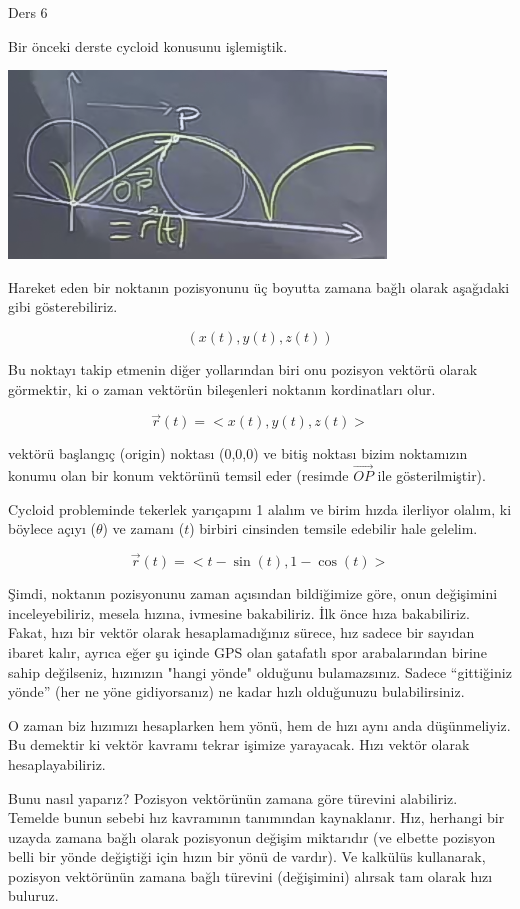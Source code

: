 \documentclass[12pt,fleqn]{article}\usepackage{../../common}
\begin{document}
Ders 6

Bir önceki derste cycloid konusunu işlemiştik. 

\includegraphics[height=5cm]{6_1.png}

Hareket eden bir noktanın pozisyonunu üç boyutta zamana bağlı olarak aşağıdaki
gibi gösterebiliriz.

$$ (x(t), y(t), z(t)) $$

Bu noktayı takip etmenin diğer yollarından biri onu pozisyon vektörü
olarak görmektir, ki o zaman vektörün bileşenleri noktanın kordinatları olur. 

$$ 
\vec{r}(t) = < x(t),y(t),z(t) > 
$$

vektörü başlangıç (origin) noktası (0,0,0) ve bitiş noktası bizim noktamızın
konumu olan bir konum vektörünü temsil eder (resimde $\vec{OP}$ ile
gösterilmiştir).

Cycloid probleminde tekerlek yarıçapını 1 alalım ve birim hızda ilerliyor
olalım, ki böylece açıyı ($\theta$) ve zamanı ($t$) birbiri cinsinden temsile
edebilir hale gelelim.

$$ \vec{r}(t) = < t-\sin(t), 1-\cos(t) >$$

Şimdi, noktanın pozisyonunu zaman açısından bildiğimize göre, onun değişimini
inceleyebiliriz, mesela hızına, ivmesine bakabiliriz. İlk önce hıza
bakabiliriz. Fakat, hızı bir vektör olarak hesaplamadığınız sürece, hız sadece
bir sayıdan ibaret kalır, ayrıca eğer şu içinde GPS olan şatafatlı spor
arabalarından birine sahip değilseniz, hızınızın "hangi yönde" olduğunu
bulamazsınız. Sadece ``gittiğiniz yönde'' (her ne yöne gidiyorsanız) ne kadar
hızlı olduğunuzu bulabilirsiniz.

O zaman biz hızımızı hesaplarken hem yönü, hem de hızı aynı anda düşünmeliyiz. 
Bu demektir ki vektör kavramı tekrar işimize yarayacak. Hızı
vektör olarak hesaplayabiliriz. 

Bunu nasıl yaparız? Pozisyon vektörünün zamana göre türevini alabiliriz. Temelde 
bunun sebebi hız kavramının tanımından kaynaklanır. Hız, herhangi bir uzayda 
zamana bağlı olarak pozisyonun değişim miktarıdır (ve elbette pozisyon belli bir 
yönde değiştiği için hızın bir yönü de vardır). Ve kalkülüs kullanarak, pozisyon 
vektörünün zamana bağlı türevini (değişimini) alırsak tam olarak hızı buluruz.
\end{document}
